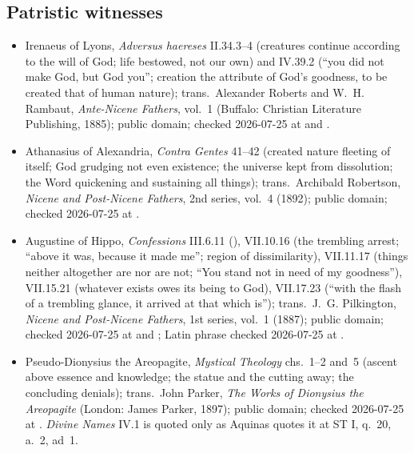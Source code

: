 \subsection*{Patristic witnesses}

{\fontsize{8.6}{9.6}\selectfont
\begin{itemize}[itemsep=0pt,parsep=0pt,topsep=0.05em]
\item Irenaeus of Lyons, \emph{Adversus haereses} II.34.3--4 (creatures continue according to the will of God; life bestowed, not our own) and IV.39.2 (``you did not make God, but God you''; creation the attribute of God's goodness, to be created that of human nature); trans.\ Alexander Roberts and W.~H. Rambaut, \emph{Ante-Nicene Fathers}, vol.~1 (Buffalo: Christian Literature Publishing, 1885); public domain; checked 2026-07-25 at  and .
\item Athanasius of Alexandria, \emph{Contra Gentes} 41--42 (created nature fleeting of itself; God grudging not even existence; the universe kept from dissolution; the Word quickening and sustaining all things); trans.\ Archibald Robertson, \emph{Nicene and Post-Nicene Fathers}, 2nd series, vol.~4 (1892); public domain; checked 2026-07-25 at .
\item Augustine of Hippo, \emph{Confessions} III.6.11 (), VII.10.16 (the trembling arrest; ``above it was, because it made me''; region of dissimilarity), VII.11.17 (things neither altogether are nor are not; ``You stand not in need of my goodness''), VII.15.21 (whatever exists owes its being to God), VII.17.23 (``with the flash of a trembling glance, it arrived at that which is''); trans.\ J.~G. Pilkington, \emph{Nicene and Post-Nicene Fathers}, 1st series, vol.~1 (1887); public domain; checked 2026-07-25 at  and ; Latin phrase checked 2026-07-25 at .
\item Pseudo-Dionysius the Areopagite, \emph{Mystical Theology} chs.~1--2 and~5 (ascent above essence and knowledge; the statue and the cutting away; the concluding denials); trans.\ John Parker, \emph{The Works of Dionysius the Areopagite} (London: James Parker, 1897); public domain; checked 2026-07-25 at . \emph{Divine Names} IV.1 is quoted only as Aquinas quotes it at ST I, q.~20, a.~2, ad~1.
\end{itemize}}

